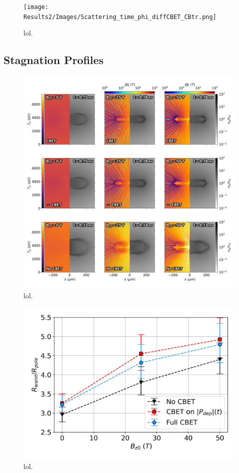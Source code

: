 \begin{figure}[t!]
    \texttt{[image: Results2/Images/Scattering\_time\_phi\_diffCBET\_CBtr.png]}
    \centering
    \caption{lol.}%
    \label{fig:Res2_scattering}
\end{figure}

\subsection{Stagnation Profiles}%
\label{sec:Res2_stgnation_profiles}


\begin{figure}[t!]
    \includegraphics[width=\linewidth]{Results2/Images/allall_stagnation.png}
    \centering
    \caption{lol.}%
    \label{fig:Res2_allall_stagnation}
\end{figure}


\begin{figure}[t!]
    \includegraphics[width=0.6\linewidth]{Results2/Images/R2R0_errors.png}
    \centering
    \caption{lol.}%
    \label{fig:Res2_R2R0_errors}
\end{figure}



